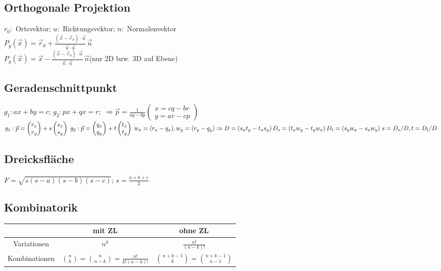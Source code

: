 \documentclass[10pt,a4paper,ngerman,oneside,twocolumn]{article}
\begin{document}
\subsection{Orthogonale Projektion}
$r_0:$ Ortsvektor; $u:$ Richtungsvektor; $n:$ Normalenvektor\\
$P_g(\vec x) =  \vec r_0 + \frac{( \vec x - \vec r_0 ) \cdot \vec u}{\vec u \cdot \vec u} \, \vec u$\\
$P_g(\vec x) = \vec x - \frac{( \vec x - \vec r_0 ) \cdot \vec n}{\vec n \cdot \vec n} \, \vec n$(nur 2D bzw. 3D auf Ebene)\\
\subsection{Geradenschnittpunkt}
$g_1: ax+by=c;\,g_2: px+qx=r;\;\Rightarrow \vec{p}=\frac{1}{aq-bp}\begin{pmatrix}
x = cq-br\\y=ar-cp
\end{pmatrix}$\\
$
g_1: \vec{p}=\begin{pmatrix}r_x\\r_y\end{pmatrix}+ s \begin{pmatrix}s_x\\s_y\end{pmatrix}\;
g_2: \vec{p}=\begin{pmatrix}q_x\\q_y\end{pmatrix}+ t \begin{pmatrix}t_x\\t_y\end{pmatrix}\; w_x=(r_x-q_x),  w_y=(r_y-q_y)\\
\Rightarrow D=(s_xt_y-t_xs_y)\, D_s=(t_xw_y-t_yw_x)\,D_t=(s_yw_x-s_xw_y)\; s=D_s/D, t=D_t/D$
\subsection{Dreicksfläche}
$F=\sqrt{s(s-a)(s-b)(s-c)};\,s=\frac{a+b+c}{2}$
\subsection{Kombinatorik}
\begin{tabular}{|c||c|c|}\hline
 & mit ZL & ohne ZL\\\hline\hline
Variationen & $n^k$ & $\frac{n!}{(n-k)!}$\\\hline
Kombinationen & $\binom{n}{k}=\binom{n}{n-k}=\frac{n!}{k!(n-k)!}$ & $\binom{n+k-1}{k}=\binom{n+k-1}{n-1}$\\\hline
\end{tabular}
\end{document}
